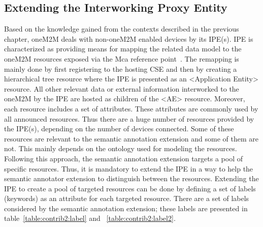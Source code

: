 \subsection{Extending the Interworking Proxy Entity}
\label{sec:contrib2:ipe}
Based on the knowledge gained from the contexts described in the previous chapter, oneM2M deals with non-oneM2M enabled devices by its IPE(s). IPE is characterized as providing means for mapping the related data model to the oneM2M resources exposed via the Mca reference point~\cite{presentationIPE}. The remapping is mainly done by first registering to the hosting CSE and then by creating a hierarchical tree resource where the IPE is presented as an <Application Entity> resource. All other relevant data or external information interworked to the oneM2M by the IPE are hosted as children of the <AE> resource. Moreover, each resource includes a set of attributes. These attributes are commonly used by all announced resources. Thus there are a huge number of resources provided by the IPE(s), depending on the number of devices connected. Some of these resources are relevant to the semantic annotation extension and some of them are not. This mainly depends on the ontology used for modeling the resources. Following this approach, the semantic annotation extension targets a pool of specific resources. Thus, it is mandatory to extend the IPE in a way to help the semantic annotator extension to distinguish between the resources. \PAR
Extending the IPE to create a pool of targeted resources can be done by defining a set of labels (keywords) as an attribute for each targeted resource. There are a set of labels considered by the semantic annotation extension; these labels are presented in table~\ref{table:contrib2:label} and ~\ref{table:contrib2:label2}.

